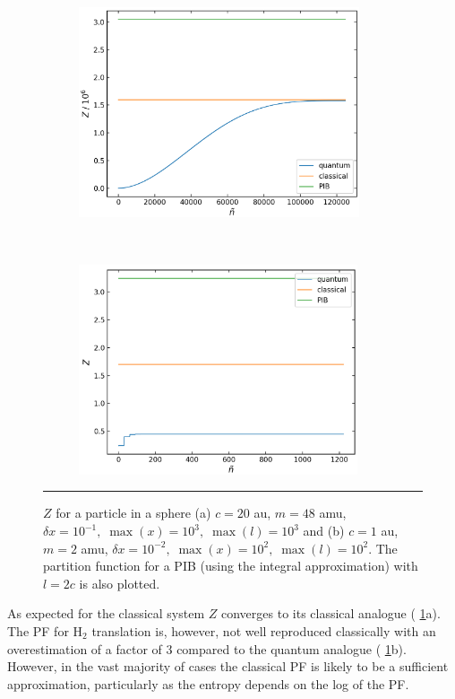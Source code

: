 \documentclass[../main.tex]{subfiles}
\begin{document}
\begin{figure}[t!]
	\begin{subfigure}[t]{0.49\textwidth}
		\centering
		\includegraphics[height=6.2cm]{4/figs/spherical_well_20_c_87456_m_point1_dx_pf}
		\caption{}
	\end{subfigure}%
	~ 
	\begin{subfigure}[t]{0.49\textwidth}
		\centering
		\includegraphics[height=6.2cm]{4/figs/spherical_well_1_c_3644_m_pf}
		\caption{}
	\end{subfigure}
	\vspace{0.2cm}
	\hrule
	\caption{$Z$ for a particle in a sphere (a) $c = 20$ au, $m = 48$ amu, $\delta x = 10^{-1},\;\max(x) = 10^3,\;\max(l) = 10^3$ and (b) $c = 1$ au, $m = 2$ amu, $\delta x = 10^{-2} ,\;\max(x) = 10^2,\;\max(l) = 10^2$. The partition function for a PIB (using the integral approximation) with $l = 2c$ is also plotted.} 
	\label{spherical_well_quantum_classical}
\end{figure}


As expected for the classical system $Z$ converges to its classical analogue (\figurename{ \ref{spherical_well_quantum_classical}}a). The PF for H$_2$ translation is, however, not well reproduced classically with an overestimation of a factor of 3 compared to the quantum analogue (\figurename{ \ref{spherical_well_quantum_classical}}b). However, in the vast majority of cases the classical PF is likely to be a sufficient approximation, particularly as the entropy depends on the log of the PF.
\end{document}
